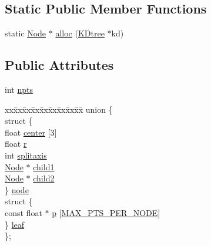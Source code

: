 \subsection*{Static Public Member Functions}
\begin{DoxyCompactItemize}
\item 
static \hyperlink{structtrimesh_1_1KDtree_1_1Node}{Node} $\ast$ \hyperlink{structtrimesh_1_1KDtree_1_1Node_aafbaa1988b404387fdecaebe976054d4}{alloc} (\hyperlink{classtrimesh_1_1KDtree}{K\+Dtree} $\ast$kd)
\end{DoxyCompactItemize}
\subsection*{Public Attributes}
\begin{DoxyCompactItemize}
\item 
int \hyperlink{structtrimesh_1_1KDtree_1_1Node_af0fca1ed6e7ea9f214eeee668c2a8564}{npts}
\item 
\begin{tabbing}
xx\=xx\=xx\=xx\=xx\=xx\=xx\=xx\=xx\=\kill
union \{\\
\>struct \{\\
\>\>float \hyperlink{structtrimesh_1_1KDtree_1_1Node_af9100b85e1af4914dc2ba23157d9d00d}{center} \mbox{[}3\mbox{]}\\
\>\>float \hyperlink{structtrimesh_1_1KDtree_1_1Node_a33b915701d1e8dc443a8c71b9956d7e0}{r}\\
\>\>int \hyperlink{structtrimesh_1_1KDtree_1_1Node_a03465bb23fce977d96e7c4d78a89a2bc}{splitaxis}\\
\>\>\hyperlink{structtrimesh_1_1KDtree_1_1Node}{Node} $\ast$ \hyperlink{structtrimesh_1_1KDtree_1_1Node_aab53e98bbfd16091a1e87ee157df5439}{child1}\\
\>\>\hyperlink{structtrimesh_1_1KDtree_1_1Node}{Node} $\ast$ \hyperlink{structtrimesh_1_1KDtree_1_1Node_ab0959270fb127073b140565e84e412dc}{child2}\\
\>\} \hyperlink{structtrimesh_1_1KDtree_1_1Node_ac076507fb2a8869ea542326baf667576}{node}\\
\>struct \{\\
\>\>const float $\ast$ \hyperlink{structtrimesh_1_1KDtree_1_1Node_a4686afc5881e4f3364ed8ef3f6a74924}{p} \mbox{[}\hyperlink{structtrimesh_1_1KDtree_1_1Node_aea4a79e439e356d170a52dbb9d369fd5a3b052d5faa949e7df63472f40af97624}{MAX\_PTS\_PER\_NODE}\mbox{]}\\
\>\} \hyperlink{structtrimesh_1_1KDtree_1_1Node_a81abfba1c0285ac6fdf61059177ff4af}{leaf}\\
\}; \\

\end{tabbing}\end{DoxyCompactItemize}


